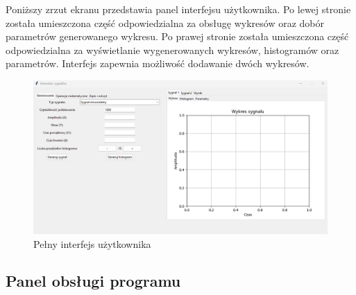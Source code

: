 \documentclass{article}
\begin{document}
Poniższy zrzut ekranu przedstawia panel interfejsu użytkownika. Po lewej stronie
            została umieszczona część odpowiedzialna za obsługę wykresów oraz dobór parametrów
            generowanego wykresu. Po prawej stronie została umieszczona część odpowiedzialna za
            wyświetlanie wygenerowanych wykresów, histogramów oraz parametrów. Interfejs zapewnia
            możliwość dodawanie dwóch wykresów.
\FloatBarrier
\begin{figure}[h!]
    \centering
    \includegraphics[width=\textwidth]{img/glowny.png}
    \caption{Pełny interfejs użytkownika}
\end{figure}

\subsection{Panel obsługi programu}  
\end{document}
